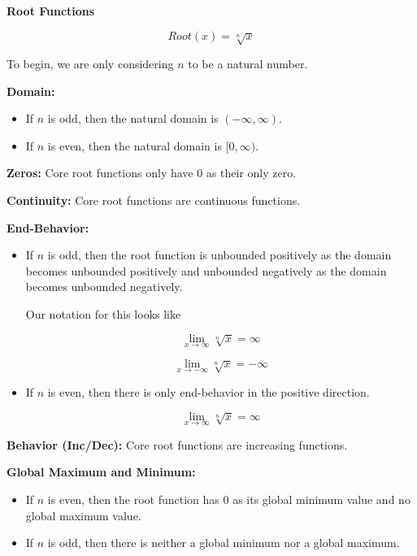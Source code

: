 \documentclass{ximera}
\begin{document}
\begin{explanation} \textbf{\textcolor{red!75!green}{Root Functions}} 


\[ Root(x) = \sqrt[n]{x}  \]

To begin, we are only considering $n$ to be a natural number.


\textbf{Domain:} 


\begin{itemize}
\item If $n$ is odd, then the natural domain is $(-\infty, \infty)$.
\item If $n$ is even, then the natural domain is $[0, \infty)$.
\end{itemize}


\textbf{Zeros:} Core root functions only have $0$ as their only zero.

\textbf{Continuity:}  Core root functions are continuous functions.

\textbf{End-Behavior:} 


\begin{itemize}
\item If $n$ is odd, then the root function is unbounded positively as the domain becomes unbounded positively and unbounded negatively as the domain becomes unbounded negatively.

Our notation for this looks like 


\[
\lim\limits_{x \to \infty} \sqrt[n]{x} = \infty
\]


\[
\lim\limits_{x \to -\infty} \sqrt[n]{x} = -\infty
\]


\item If $n$ is even, then there is only end-behavior in the positive direction.

\[
\lim\limits_{x \to \infty} \sqrt[n]{x} = \infty
\]



\end{itemize}


\textbf{Behavior (Inc/Dec):}  Core root functions are increasing functions.

\textbf{Global Maximum and Minimum:}  

\begin{itemize}
\item If $n$ is even, then the root function has $0$ as its global minimum value and no global maximum value.
\item If $n$ is odd, then there is neither a global minimum nor a global maximum.
\end{itemize} 


\end{explanation}
\end{document}

